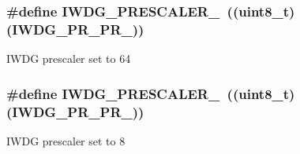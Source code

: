 \subsubsection[{\texorpdfstring{I\+W\+D\+G\+\_\+\+P\+R\+E\+S\+C\+A\+L\+E\+R\+\_\+64}{IWDG_PRESCALER_64}}]{\setlength{\rightskip}{0pt plus 5cm}\#define I\+W\+D\+G\+\_\+\+P\+R\+E\+S\+C\+A\+L\+E\+R\+\_~((uint8\+\_\+t)({\bf I\+W\+D\+G\+\_\+\+P\+R\+\_\+\+P\+R\+\_}))}\hypertarget{group___i_w_d_g___prescaler_ga52a956c645ce59312c84cbe37b2b20e4}{}\label{group___i_w_d_g___prescaler_ga52a956c645ce59312c84cbe37b2b20e4}
I\+W\+DG prescaler set to 64 
\subsubsection[{\texorpdfstring{I\+W\+D\+G\+\_\+\+P\+R\+E\+S\+C\+A\+L\+E\+R\+\_\+8}{IWDG_PRESCALER_8}}]{\setlength{\rightskip}{0pt plus 5cm}\#define I\+W\+D\+G\+\_\+\+P\+R\+E\+S\+C\+A\+L\+E\+R\+\_~((uint8\+\_\+t)({\bf I\+W\+D\+G\+\_\+\+P\+R\+\_\+\+P\+R\+\_}))}\hypertarget{group___i_w_d_g___prescaler_ga5f00866f823ee700005e8a753b28ad75}{}\label{group___i_w_d_g___prescaler_ga5f00866f823ee700005e8a753b28ad75}
I\+W\+DG prescaler set to 8 